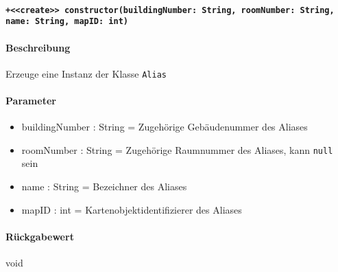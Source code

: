 \paragraph{\texttt{+<<create>> constructor(buildingNumber: String, roomNumber: String, name: String, mapID: int)}}%
\paragraph*{Beschreibung}
Erzeuge eine Instanz der Klasse \verb#Alias#
\paragraph*{Parameter}
\begin{itemize}
    \item buildingNumber : String = Zugehörige Gebäudenummer des Aliases
    \item roomNumber : String = Zugehörige Raumnummer des Aliases, kann \verb#null# sein
    \item name : String = Bezeichner des Aliases
    \item mapID : int = Kartenobjektidentifizierer des Aliases
\end{itemize}
\paragraph*{Rückgabewert}
void